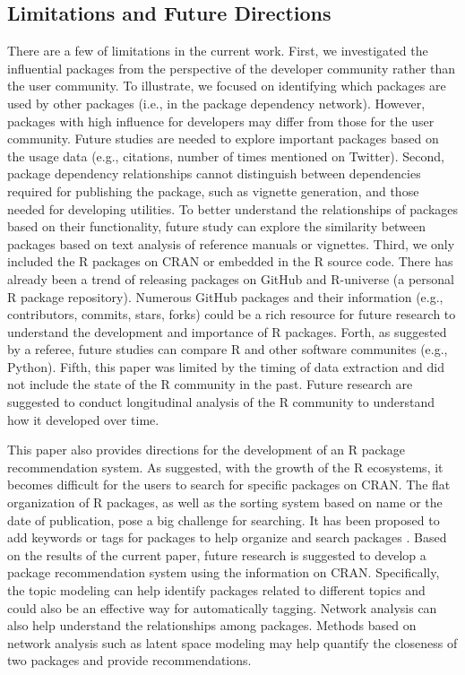 \subsection{Limitations and Future Directions}

There are a few of limitations in the current work. First, we investigated the influential packages from the perspective of the developer community rather than the user community. To illustrate, we focused on identifying which packages are used by other packages (i.e., in the package dependency network). However, packages with high influence for developers may differ from those for the user community. Future studies are needed to explore important packages based on the usage data (e.g., citations, number of times mentioned on Twitter). Second, package dependency relationships cannot distinguish between dependencies required for publishing the package, such as vignette generation, and those needed for developing utilities. To better understand the relationships of packages based on their functionality, future study can explore the similarity between packages based on text analysis of reference manuals or vignettes. Third, we only included the R packages on CRAN or embedded in the R source code. There has already been a trend of releasing packages on GitHub and R-universe (a personal R package repository). Numerous GitHub packages and their information (e.g., contributors, commits, stars, forks) could be a rich resource for future research to understand the development and importance of R packages. Forth, as suggested by a referee, future studies can compare R and other software communites (e.g., Python). Fifth, this paper was limited by the timing of data extraction and did not include the state of the R community in the past. Future research are suggested to conduct longitudinal analysis of the R community to understand how it developed over time.

This paper also provides directions for the development of an R package recommendation system.   As \citet{RJ-2018-058} suggested, with the growth of the R ecosystems, it becomes difficult for the users to search for specific packages on CRAN. The flat organization of R packages, as well as the sorting system based on name or the date of publication, pose a big challenge for searching. It has been proposed to add keywords or tags for packages to help organize and search packages \citep{RJ-2018-058}.  Based on the results of the current paper, future research is suggested to develop a package recommendation system using the information on CRAN. Specifically, the topic modeling can help identify packages related to different topics and could also be an effective way for automatically tagging. Network analysis can also help understand the relationships among packages. Methods based on network analysis such as latent space modeling may help quantify the closeness of two packages and provide recommendations.


